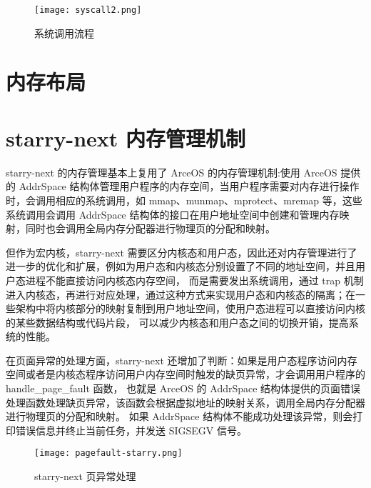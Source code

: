 \begin{figure}[H]
    \centering
    \texttt{[image: syscall2.png]}
    \caption{系统调用流程}
    \label{fig:syscall}
\end{figure}


\section{内存布局}


\section{starry-next 内存管理机制}

starry-next 的内存管理基本上复用了 ArceOS 的内存管理机制:使用 ArceOS 提供的 AddrSpace 结构体管理用户程序的内存空间，当用户程序需要对内存进行操作时，会调用相应的系统调用，如 mmap、munmap、mprotect、mremap 等，这些系统调用会调用 AddrSpace 结构体的接口在用户地址空间中创建和管理内存映射，同时也会调用全局内存分配器进行物理页的分配和映射。

但作为宏内核，starry-next 需要区分内核态和用户态，因此还对内存管理进行了进一步的优化和扩展，例如为用户态和内核态分别设置了不同的地址空间，并且用户态进程不能直接访问内核态内存空间，
而是需要发出系统调用，通过 trap 机制进入内核态，再进行对应处理，通过这种方式来实现用户态和内核态的隔离；在一些架构中将内核部分的映射复制到用户地址空间，使用户态进程可以直接访问内核的某些数据结构或代码片段，
可以减少内核态和用户态之间的切换开销，提高系统的性能。

在页面异常的处理方面，starry-next 还增加了判断：如果是用户态程序访问内存空间或者是内核态程序访问用户内存空间时触发的缺页异常，才会调用用户程序的 handle\_page\_fault 函数，
也就是 ArceOS 的 AddrSpace 结构体提供的页面错误处理函数处理缺页异常，该函数会根据虚拟地址的映射关系，调用全局内存分配器进行物理页的分配和映射。
如果 AddrSpace 结构体不能成功处理该异常，则会打印错误信息并终止当前任务，并发送 SIGSEGV 信号。

\begin{figure}[H]
    \centering
    \texttt{[image: pagefault-starry.png]}
    \caption{starry-next 页异常处理}
    \label{fig:pagefault-starry}
\end{figure}
